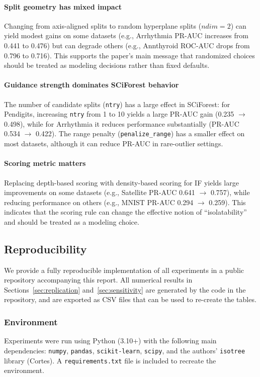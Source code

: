 \paragraph{Split geometry has mixed impact}
Changing from axis-aligned splits to random hyperplane splits ($ndim=2$) can yield modest gains on some datasets (e.g., Arrhythmia PR-AUC increases from 0.441 to 0.476) but can degrade others (e.g., Annthyroid ROC-AUC drops from 0.796 to 0.716).
This supports the paper's main message that randomized choices should be treated as modeling decisions rather than fixed defaults.

\paragraph{Guidance strength dominates SCiForest behavior}
The number of candidate splits (\texttt{ntry}) has a large effect in SCiForest: for Pendigits, increasing \texttt{ntry} from 1 to 10 yields a large PR-AUC gain (0.235 $\rightarrow$ 0.498), while for Arrhythmia it reduces performance substantially (PR-AUC 0.534 $\rightarrow$ 0.422).
The range penalty (\texttt{penalize\_range}) has a smaller effect on most datasets, although it can reduce PR-AUC in rare-outlier settings.

\paragraph{Scoring metric matters}
Replacing depth-based scoring with density-based scoring for IF yields large improvements on some datasets (e.g., Satellite PR-AUC 0.641 $\rightarrow$ 0.757), while reducing performance on others (e.g., MNIST PR-AUC 0.294 $\rightarrow$ 0.259).
This indicates that the scoring rule can change the effective notion of ``isolatability'' and should be treated as a modeling choice.

\subsection{Reproducibility}
\label{sec:reproducibility}

We provide a fully reproducible implementation of all experiments in a public repository accompanying this report.
All numerical results in Sections~\ref{sec:replication} and~\ref{sec:sensitivity} are generated by the code in the repository, and are exported as CSV files that can be used to re-create the tables.

\subsubsection{Environment}
Experiments were run using Python (3.10+) with the following main dependencies:
\texttt{numpy}, \texttt{pandas}, \texttt{scikit-learn}, \texttt{scipy}, and the authors' \texttt{isotree} library (Cortes).
A \texttt{requirements.txt} file is included to recreate the environment.

